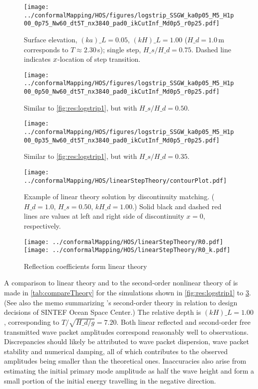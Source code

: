 \begin{figure}[h!ptb]%
\centering
\texttt{[image: ../conformalMapping/HOS/figures/logstrip\_SSGW\_ka0p05\_M5\_H1p00\_0p75\_Nw60\_dt5T\_nx3840\_pad0\_ikCutInf\_Md0p5\_r0p25.pdf]}%
\caption{Surface elevation, $(ka)\_L = 0.05$, $(kH)\_L = 1.00$ ($H\_d=1.0$\,m corresponds to $T\approx2.30$\,s); single step, $H\_s/H\_d = 0.75$. Dashed line indicates $x$-location of step transition.}%
\label{fig:res:logstrip1}%
\end{figure}
\begin{figure}[h!ptb]%
\centering 
\texttt{[image: ../conformalMapping/HOS/figures/logstrip\_SSGW\_ka0p05\_M5\_H1p00\_0p50\_Nw60\_dt5T\_nx3840\_pad0\_ikCutInf\_Md0p5\_r0p25.pdf]}%
\caption{Similar to \autoref{fig:res:logstrip1}, but with $H\_s/H\_d = 0.50$.}%
\label{fig:res:logstrip2}%
\end{figure}
\begin{figure}[h!ptb]%
\centering 															  
\texttt{[image: ../conformalMapping/HOS/figures/logstrip\_SSGW\_ka0p05\_M5\_H1p00\_0p35\_Nw60\_dt5T\_nx3840\_pad0\_ikCutInf\_Md0p5\_r0p25.pdf]}%
\caption{Similar to \autoref{fig:res:logstrip1}, but with $H\_s/H\_d = 0.35$.}%
\label{fig:res:logstrip3}%
\end{figure}


\begin{figure}[h!ptb]%
\centering
\texttt{[image: ../conformalMapping/HOS/linearStepTheory/contourPlot.pdf]}%
\caption{Example of linear theory solution by discontinuity matching. ($H\_d = 1.0$, $H\_s = 0.50$, $kH\_d = 1.00$.) Solid black and dashed red lines are values at left and right side of discontinuity $x=0$, respectively.}%
\label{fig:linearReflection:contour}%
\end{figure}

\begin{figure}[h!ptb]%
\centering
\texttt{[image: ../conformalMapping/HOS/linearStepTheory/R0.pdf]}%
\texttt{[image: ../conformalMapping/HOS/linearStepTheory/R0\_k.pdf]}%
\caption{Reflection coefficients form linear theory}%
\label{fig:linearReflection:R0}%
\end{figure}



A comparison to linear theory and to the second-order nonlinear theory of \citet{li_2021_step1} is made in \autoref{tab:compareTheory} for the simulations shown in \autoref{fig:res:logstrip1} to \ref{fig:res:logstrip3}.
(See also the memo \citet{AHA_2021_LiTheory} summarizing \citeauthor{li_2021_step1}'s second-order theory in relation to design decisions of SINTEF Ocean Space Center.)
The relative depth is $(kH)\_L=1.00$,  corresponding to $T/\sqrt{H\_d/g}=7.20$.
Both linear reflected and second-order free transmitted wave packet amplitudes correspond reasonably well to observations.
Discrepancies should likely be attributed to wave packet dispersion, wave packet stability and numerical damping, all of which contributes to the observed amplitudes being smaller than the theoretical ones.
Inaccuracies also arise from estimating the initial primary mode amplitude as half the wave height and form a small portion of the initial energy travelling in the negative direction.

